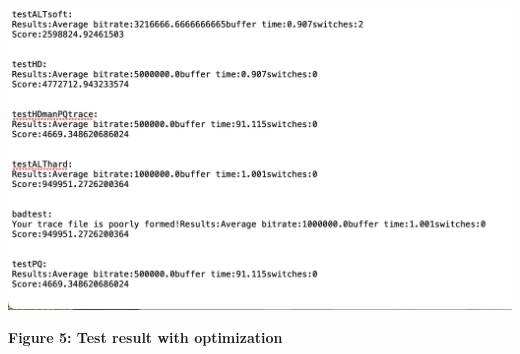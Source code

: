 ~\\
\centerline {\includegraphics[scale = 1, width=14cm]{imp2}}
\centerline{\textbf {Figure 5: Test result with optimization}}


